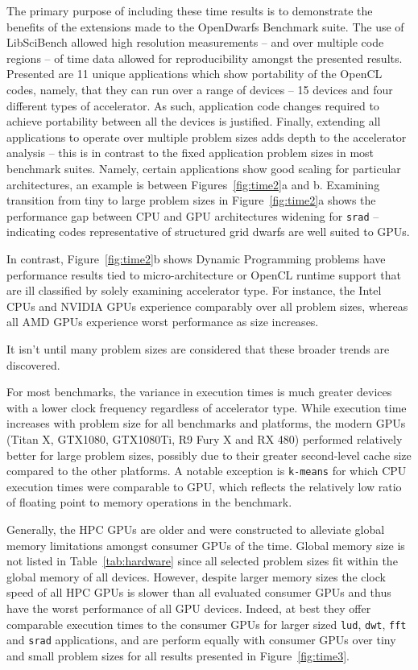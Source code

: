 \documentclass[../document.tex]{subfiles}
\begin{document}
The primary purpose of including these time results is to demonstrate the benefits of the extensions made to the OpenDwarfs Benchmark suite.
The use of LibSciBench allowed high resolution measurements -- and over multiple code regions -- of time data allowed for reproducibility amongst the presented results.
Presented are 11 unique applications which show portability of the OpenCL codes, namely, that they can run over a range of devices -- 15 devices and four different types of accelerator.
As such, application code changes required to achieve portability between all the devices is justified.
Finally, extending all applications to operate over multiple problem sizes adds depth to the accelerator analysis -- this is in contrast to the fixed application problem sizes in most benchmark suites.
Namely, certain applications show good scaling for particular architectures, an example is between Figures~\ref{fig:time2}a and b.
Examining transition from tiny to large problem sizes in Figure~\ref{fig:time2}a shows the performance gap between CPU and GPU architectures widening for {\tt srad} -- indicating codes representative of structured grid dwarfs are well suited to GPUs.

In contrast, Figure~\ref{fig:time2}b shows Dynamic Programming problems have performance results tied to micro-architecture or OpenCL runtime support that are ill classified by solely examining accelerator type.
For instance, the Intel CPUs and NVIDIA GPUs experience comparably over all problem sizes, whereas all AMD GPUs experience worst performance as size increases.

It isn't until many problem sizes are considered that these broader trends are discovered.

For most benchmarks, the variance in execution times is much greater devices with a lower clock frequency regardless of accelerator type.
While execution time increases with problem size for all benchmarks and platforms, the modern GPUs (Titan X, GTX1080, GTX1080Ti, R9 Fury X and RX 480) performed relatively better for large problem sizes, possibly due to their greater second-level cache size compared to the other platforms.
A notable exception is {\tt k-means} for which CPU execution times were comparable to GPU, which reflects the relatively low ratio of floating point to memory operations in the benchmark.

Generally, the HPC GPUs are older and were constructed to alleviate global memory limitations amongst consumer GPUs of the time.
Global memory size is not listed in Table~\ref{tab:hardware} since all selected problem sizes fit within the global memory of all devices.
However, despite larger memory sizes the clock speed of all HPC GPUs is slower than all evaluated consumer GPUs and thus have the worst performance of all GPU devices.
Indeed, at best they offer comparable execution times to the consumer GPUs for larger sized {\tt lud}, {\tt dwt}, {\tt fft} and {\tt srad} applications, and are perform equally with consumer GPUs over tiny and small problem sizes for all results presented in Figure~\ref{fig:time3}.
\end{document}
